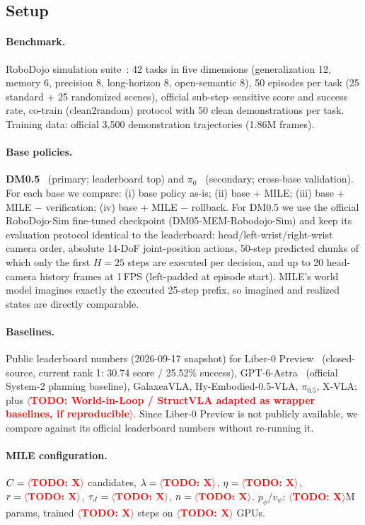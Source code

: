 \documentclass{article}
\newcommand{\mile}{\textsc{MILE}}
\newcommand{\TODO}[1]{\textcolor{red}{\textbf{$\langle$TODO: #1$\rangle$}}}
\begin{document}
\subsection{Setup}
\label{sec:setup}

\paragraph{Benchmark.}
RoboDojo simulation suite~\cite{robodojo}: 42 tasks in five dimensions (generalization 12, memory 6, precision 8, long-horizon 8, open-semantic 8), 50 episodes per task (25 standard + 25 randomized scenes), official sub-step--sensitive score and success rate, co-train (clean2random) protocol with 50 clean demonstrations per task. Training data: official 3{,}500 demonstration trajectories (1.86M frames).

\paragraph{Base policies.}
\textbf{DM0.5}~\cite{dm05} (primary; leaderboard top) and $\pi_0$~\cite{pi0} (secondary; cross-base validation). For each base we compare: (i) base policy as-is; (ii) base + \mile{}; (iii) base + \mile{} $-$ verification; (iv) base + \mile{} $-$ rollback.
For DM0.5 we use the official RoboDojo-Sim fine-tuned checkpoint (DM05-MEM-Robodojo-Sim) and keep its evaluation protocol identical to the leaderboard: head/left-wrist/right-wrist camera order, absolute 14-DoF joint-position actions, 50-step predicted chunks of which only the first $H{=}25$ steps are executed per decision, and up to 20 head-camera history frames at 1\,FPS (left-padded at episode start). \mile{}'s world model imagines exactly the executed 25-step prefix, so imagined and realized states are directly comparable.

\paragraph{Baselines.}
Public leaderboard numbers (2026-09-17 snapshot) for Liber-0 Preview~\cite{liber0} (closed-source, current rank 1: 30.74 score / 25.52\% success), GPT-6-Astra~\cite{gpt6astra} (official System-2 planning baseline), GalaxeaVLA, Hy-Embodied-0.5-VLA, $\pi_{0.5}$, X-VLA; plus \TODO{World-in-Loop / StructVLA adapted as wrapper baselines, if reproducible}. Since Liber-0 Preview is not publicly available, we compare against its official leaderboard numbers without re-running it.

\paragraph{\mile{} configuration.}
$C = \TODO{X}$ candidates, $\lambda = \TODO{X}$, $\eta = \TODO{X}$, $r = \TODO{X}$, $\tau_J = \TODO{X}$, $n = \TODO{X}$. $p_\phi$/$v_\psi$: \TODO{X}M params, trained \TODO{X} steps on \TODO{X} GPUs.
\end{document}
